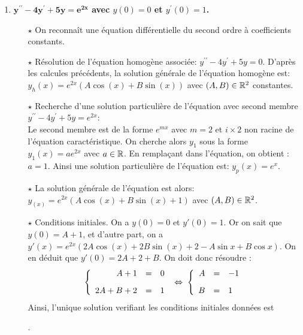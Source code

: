 \documentclass[a4paper, 11pt,reqno]{article}
\begin{document}
\begin{correction}
\begin{enumerate}
\begin{itemize}
.
\end{itemize}
\item \textbf{$\mathbf{y^{\prime\prime}-4y^{\prime}+5y=e^{2x}}$ avec $y(0)=0$ et $y^{\prime}(0)=1$.}\\
\begin{itemize}
\item[$\star$] On reconna\^{i}t une \'equation diff\'erentielle du second ordre \`{a} coefficients constants.
\item[$\star$] R\'esolution de l'\'equation homog\`{e}ne associ\'ee: $y^{\prime\prime}-4y^{\prime}+5y=0$. D'apr\`es les calcules pr\'ec\'edents, la solution g\'en\'erale de l'\'equation homog\`{e}ne est: $y_h(x) = e^{2x}(A \cos(x) + B \sin(x))$ avec $(A,B)\in\mathbb{R}^2$ constantes.
\item[$\star$] Recherche d'une solution particuli\`{e}re de l'\'equation avec second membre $y^{\prime\prime}-4y^{\prime}+5y=e^{2x}$:\\
\noindent Le second membre est de la forme $e^{mx}$ avec $m=2$ et $i\times 2$ non racine de l'\'equation caract\'eristique. On cherche alors $y_1$ sous la forme $y_1(x)=a e^{2 x}$ avec $a \in \mathbb{R}$. En rempla\c cant dans l'\'equation, on obtient : $a=1$. Ainsi une solution particuli\`{e}re de l'\'equation est: $y_p(x)=e^x$.
\item[$\star$] La solution g\'en\'erale de l'\'equation est alors: $y_(x) = e^{2x}(A \cos(x) + B \sin(x)+1)$ avec $(A,B)\in\mathbb{R}^2$.
\item[$\star$] Conditions initiales. On a $y(0)=0$ et $y'(0)=1$. Or on sait que $y(0)=A+1$, et d'autre part, on a $y'(x)=e^{2x}(2A \cos(x) + 2B \sin(x) + 2 -A\sin x +B \cos x)$. On en d\'eduit que $y'(0)=2A+2+B$. On doit donc r\'esoudre :
$$\left\{ \begin{array}{rcl}
A+1 & = & 0\vsec\\
2A+B+2 & = & 1
\end{array} \right. \; \Leftrightarrow \; 
\left\{ \begin{array}{rcl}
A & = & -1 \vsec\\
B & = & 1
\end{array} \right.$$
Ainsi, l'unique solution v\?erifiant les conditions initiales donn\'ees est 

.
\end{itemize}
\end{enumerate}
\end{correction}
\vspace{0.5cm}
\end{document}
